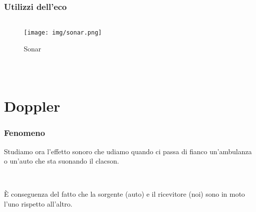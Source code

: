 \documentclass[]{beamer}
\theoremstyle{plain}
\begin{document}
\begin{frame}
  \frametitle{Utilizzi dell'eco}
  \begin{columns}
    \begin{column}{0.3\textwidth}
      \begin{figure}
        \texttt{[image: img/sonar.png]}
        
        Sonar
        
        ~
      \end{figure}
    \end{column}
    \begin{column}{0.3\textwidth}
    \end{column}
    \begin{column}{0.3\textwidth}
    \end{column}
  \end{columns}
\end{frame}

\section{Doppler}

\begin{frame}
\frametitle{Fenomeno}
Studiamo ora l'effetto sonoro che udiamo quando ci passa di fianco un'ambulanza o un'auto che sta suonando il clacson. \href{video/Dopplerauto.mp4}{}\pause

~

È conseguenza del fatto che la sorgente (auto) e il ricevitore (noi) sono \alert<2>{in moto l'uno rispetto all'altro}.

\end{frame}
\end{document}
